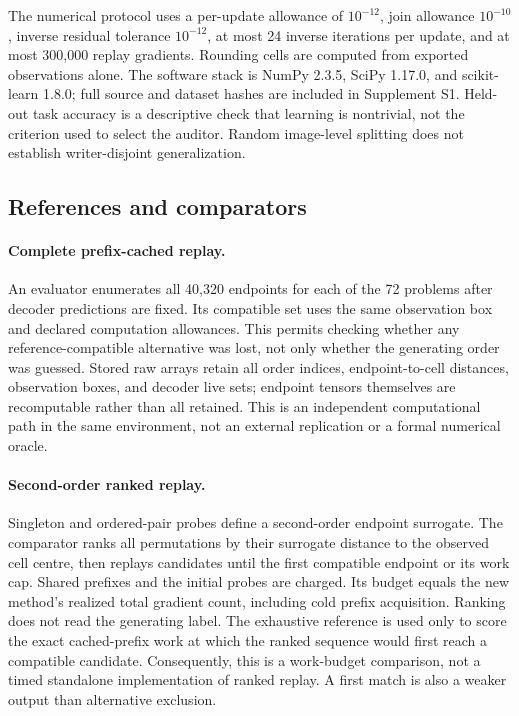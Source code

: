 The numerical protocol uses a per-update allowance of $10^{-12}$, join allowance $10^{-10}$, inverse residual tolerance $10^{-12}$, at most 24 inverse iterations per update, and at most 300,000 replay gradients. Rounding cells are computed from exported observations alone. The software stack is NumPy 2.3.5, SciPy 1.17.0, and scikit-learn 1.8.0; full source and dataset hashes are included in Supplement S1. Held-out task accuracy is a descriptive check that learning is nontrivial, not the criterion used to select the auditor. Random image-level splitting does not establish writer-disjoint generalization.

\subsection{References and comparators}
\paragraph{Complete prefix-cached replay.}
An evaluator enumerates all 40,320 endpoints for each of the 72 problems after decoder predictions are fixed. Its compatible set uses the same observation box and declared computation allowances. This permits checking whether any reference-compatible alternative was lost, not only whether the generating order was guessed. Stored raw arrays retain all order indices, endpoint-to-cell distances, observation boxes, and decoder live sets; endpoint tensors themselves are recomputable rather than all retained. This is an independent computational path in the same environment, not an external replication or a formal numerical oracle.

\paragraph{Second-order ranked replay.}
Singleton and ordered-pair probes define a second-order endpoint surrogate. The comparator ranks all permutations by their surrogate distance to the observed cell centre, then replays candidates until the first compatible endpoint or its work cap. Shared prefixes and the initial probes are charged. Its budget equals the new method's realized total gradient count, including cold prefix acquisition. Ranking does not read the generating label. The exhaustive reference is used only to score the exact cached-prefix work at which the ranked sequence would first reach a compatible candidate. Consequently, this is a work-budget comparison, not a timed standalone implementation of ranked replay. A first match is also a weaker output than alternative exclusion.

